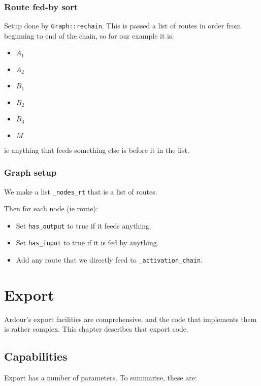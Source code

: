 \documentclass[10pt,a4paper]{book}
\newcommand{\code}[1]{\texttt{#1}}
\begin{document}
\subsection{Route fed-by sort}

Setup done by \code{Graph::rechain}.  This is passed a list of routes
in order from beginning to end of the chain, so for our example it is:

\begin{itemize}
\item $A_1$
\item $A_2$
\item $B_1$
\item $B_2$
\item $B_3$
\item $M$
\end{itemize}

ie anything that feeds something else is before it in the list.

\subsection{Graph setup}

We make a list \code{\_nodes\_rt} that is a list of routes.

Then for each node (ie route):

\begin{itemize}
\item Set \code{has\_output} to true if it feeds anything.
\item Set \code{has\_input} to true if it is fed by anything.
\item Add any route that we directly feed to \code{\_activation\_chain}.
\end{itemize}

\chapter{Export}

Ardour's export facilities are comprehensive, and the code that
implements them is rather complex.  This chapter describes that export code.

\section{Capabilities}

Export has a number of parameters.  To summarise, these are:
\end{document}
